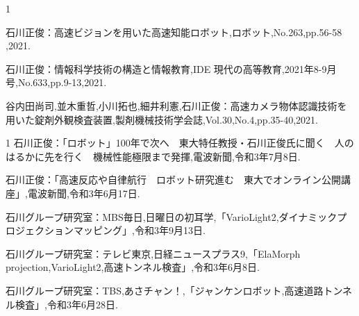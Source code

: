 \begin{発表}{1}

石川正俊：高速ビジョンを用いた高速知能ロボット,ロボット,No.263,pp.56-58 ,2021.

石川正俊：情報科学技術の構造と情報教育,IDE 現代の高等教育,2021年8-9月号,No.633,pp.9-13,2021.

谷内田尚司,並木重哲,小川拓也,細井利憲,石川正俊：高速カメラ物体認識技術を用いた錠剤外観検査装置,製剤機械技術学会誌,Vol.30,No.4,pp.35-40,2021.

\end{発表}

\begin{報道}{1}
石川正俊：「ロボット」100年で次へ　東大特任教授・石川正俊氏に聞く　人のはるかに先を行く　機械性能極限まで発揮,電波新聞,令和3年7月8日.

石川正俊：「高速反応や自律航行　ロボット研究進む　東大でオンライン公開講座」,電波新聞,令和3年6月17日.

石川グループ研究室：MBS毎日,日曜日の初耳学,「VarioLight2,ダイナミックプロジェクションマッピング」,令和3年9月13日.

石川グループ研究室：テレビ東京,日経ニュースプラス9,「ElaMorph projection,VarioLight2,高速トンネル検査」,令和3年6月8日.

石川グループ研究室：TBS,あさチャン！,「ジャンケンロボット,高速道路トンネル検査」,令和3年6月28日.

\end{報道}






